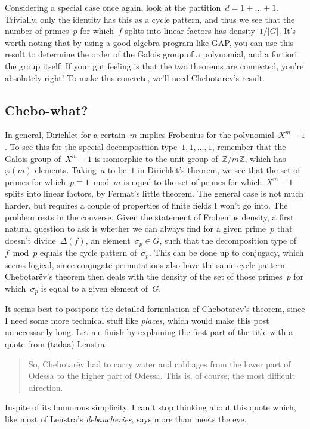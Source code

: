 Considering a special case once again, look at the partition~$d=1+\ldots+1$. Trivially, only the identity has this as a cycle pattern, and thus we see that the number of primes~$p$ for which~$f$ splits into linear factors has density~$1/\vert G \vert$. It's worth noting that by using a good algebra program like GAP{,} you can use this result to determine the order of the Galois group of a polynomial, and a fortiori the group itself. If your gut feeling is that the two theorems are connected, you're absolutely right! To make this concrete, we'll need Chebotar\"ev's result.

\subsection{Chebo-what?}

In general, Dirichlet for a certain~$m$ implies Frobenius for the polynomial~$X^{m}-1$. To see this for the special decomposition type~$1,1,\ldots,1$, remember that the Galois group of~$X^{m}-1$ is isomorphic to the unit group of~$\mathbb{Z}/m\mathbb{Z}$, which has~$\varphi(m)$ elements. Taking~$a$ to be~$1$ in Dirichlet's theorem, we see that the set of primes for which~$p \equiv 1\bmod m$ is equal to the set of primes for which~$X^{m}-1$ splits into linear factors, by Fermat's little theorem. The general case is not much harder, but requires a couple of properties of finite fields I won't go into. The problem rests in the converse. Given the statement of Frobenius density, a first natural question to ask is whether we can always find for a given prime~$p$ that doesn't divide~$\Delta(f)$, an element~$\sigma_{p} \in G$, such that the decomposition type of~$f\bmod p$ equals the cycle pattern of~$\sigma_{p}$. This can be done up to conjugacy, which seems logical, since conjugate permutations also have the same cycle pattern. Chebotar\"ev's theorem then deals with the density of the set of those primes~$p$ for which~$\sigma_{p}$ is equal to a given element of~$G$.

It seems best to postpone the detailed formulation of Chebotar\"ev's theorem, since I need some more technical stuff like \emph{places}, which would make this post unnecessarily long. Let me finish by explaining the first part of the title with a quote from (tadaa) Lenstra:
\begin{quote}
  So, Chebotar\"ev had to carry water and cabbages from the lower part of Odessa to the higher part of Odessa. This is, of course, the most difficult direction.
\end{quote}
Inspite of its humorous simplicity, I can't stop thinking about this quote which, like most of Lenstra's \emph{debaucheries}, says more than meets the eye.
